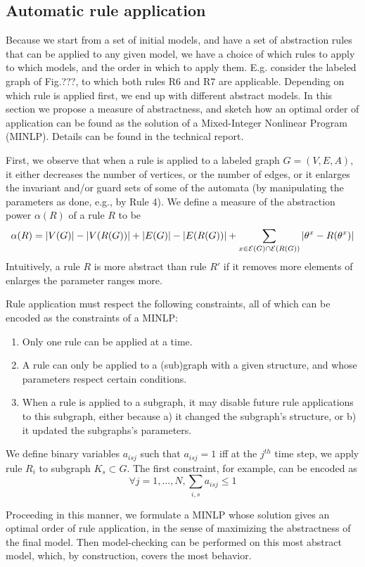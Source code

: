 \subsection{Automatic rule application}
\label{automatedApplication}

Because we start from a set of initial models, and have a set of abstraction rules that can be applied to any given model, we have a choice of which rules to apply to which models, and the order in which to apply them.
E.g. consider the labeled graph of Fig.???, to which both rules R6 and R7 are applicable.
Depending on which rule is applied first, we end up with different abstract models.
In this section we propose a measure of abstractness, and sketch how an optimal order of application can be found as the solution of a Mixed-Integer Nonlinear Program (MINLP).
Details can be found in the technical report. 

First, we observe that when a rule is applied to a labeled graph $G=(V,E,A)$, it either decreases the number of vertices, or the number of edges, or it enlarges the invariant and/or guard sets of some of the automata (by manipulating the parameters as done, e.g., by Rule 4).
We define a measure of the abstraction power $\alpha(R)$ of a rule $R$ to be
\[\alpha(R) = |V(G)| - |V(R(G))| + |E(G)| - |E(R(G))| + \sum_{x \in \mathcal{E}(G)\cap \mathcal{E}(R(G))}|\theta^x - R(\theta^x)|\] 
Intuitively, a rule $R$ is more abstract than rule $R'$ if it removes more elements of enlarges the parameter ranges more.

Rule application must respect the following constraints, all of which can be encoded as the constraints of a MINLP:
\begin{enumerate}
	\item Only one rule can be applied at a time.
	\item A rule can only be applied to a (sub)graph with a given structure, and whose parameters respect certain conditions.
	\item When a rule is applied to a subgraph, it may disable future rule applications to this subgraph, either because a) it changed the subgraph's structure, or b) it updated the subgraphs's parameters.
\end{enumerate}
We define binary variables $a_{isj}$ such that $a_{isj} = 1$ iff at the $j^{th}$ time step, we apply rule $R_i$ to subgraph $K_s \subset G$.
The first constraint, for example, can be encoded as
\[\forall j=1,\ldots, N, \sum_{i,s}a_{isj} \leq 1\]

Proceeding in this manner, we formulate a MINLP whose solution gives an optimal order of rule application, in the sense of maximizing the abstractness of the final model.
Then model-checking can be performed on this most abstract model, which, by construction, covers the most behavior.